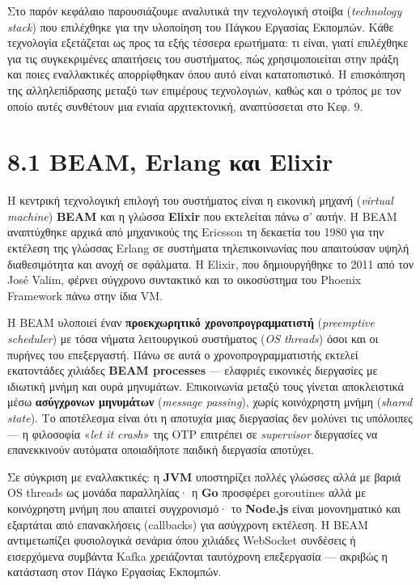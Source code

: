 \documentclass[11pt,a4paper,greek,twoside]{template-xe}
\begin{document}
Στο παρόν κεφάλαιο παρουσιάζουμε αναλυτικά την τεχνολογική στοίβα
(\emph{technology stack}) που επιλέχθηκε για την υλοποίηση του Πάγκου
Εργασίας Εκπομπών. Κάθε τεχνολογία εξετάζεται ως προς τα εξής τέσσερα
ερωτήματα: τι είναι, γιατί επιλέχθηκε για τις συγκεκριμένες απαιτήσεις
του συστήματος, πώς χρησιμοποιείται στην πράξη και ποιες εναλλακτικές
απορρίφθηκαν όπου αυτό είναι κατατοπιστικό. Η επισκόπηση της
αλληλεπίδρασης μεταξύ των επιμέρους τεχνολογιών, καθώς και ο τρόπος με
τον οποίο αυτές συνθέτουν μια ενιαία αρχιτεκτονική, αναπτύσσεται στο
Κεφ. 9.

\section{8.1 BEAM, Erlang και
Elixir}\label{beam-erlang-ux3baux3b1ux3b9-elixir}

Η κεντρική τεχνολογική επιλογή του συστήματος είναι η εικονική μηχανή
(\emph{virtual machine}) \textbf{BEAM} και η γλώσσα \textbf{Elixir} που
εκτελείται πάνω σ' αυτήν. Η BEAM αναπτύχθηκε αρχικά από μηχανικούς της
Ericsson τη δεκαετία του 1980 για την εκτέλεση της γλώσσας Erlang σε
συστήματα τηλεπικοινωνίας που απαιτούσαν υψηλή διαθεσιμότητα και ανοχή
σε σφάλματα. Η Elixir, που δημιουργήθηκε το 2011 από τον José Valim,
φέρνει σύγχρονο συντακτικό και το οικοσύστημα του Phoenix Framework πάνω
στην ίδια VM.

Η BEAM υλοποιεί έναν \textbf{προεκχωρητικό χρονοπρογραμματιστή}
(\emph{preemptive scheduler}) με τόσα νήματα λειτουργικού συστήματος
(\emph{OS threads}) όσοι και οι πυρήνες του επεξεργαστή. Πάνω σε αυτά ο
χρονοπρογραμματιστής εκτελεί εκατοντάδες χιλιάδες \textbf{BEAM
processes} --- ελαφριές εικονικές διεργασίες με ιδιωτική μνήμη και ουρά
μηνυμάτων. Επικοινωνία μεταξύ τους γίνεται αποκλειστικά μέσω
\textbf{ασύγχρονων μηνυμάτων} (\emph{message passing}), χωρίς
κοινόχρηστη μνήμη (\emph{shared state}). Το αποτέλεσμα είναι ότι η
αποτυχία μιας διεργασίας δεν μολύνει τις υπόλοιπες --- η φιλοσοφία
«\emph{let it crash}» της OTP επιτρέπει σε \emph{supervisor} διεργασίες
να επανεκκινούν αυτόματα οποιαδήποτε παιδική διεργασία αποτύχει.

Σε σύγκριση με εναλλακτικές: η \textbf{JVM} υποστηρίζει πολλές γλώσσες
αλλά με βαριά OS threads ως μονάδα παραλληλίας· η \textbf{Go} προσφέρει
goroutines αλλά με κοινόχρηστη μνήμη που απαιτεί συγχρονισμό· το
\textbf{Node.js} είναι μονονηματικό και εξαρτάται από επανακλήσεις
(callbacks) για ασύγχρονη εκτέλεση. Η BEAM αντιμετωπίζει φυσιολογικά
σενάρια όπου χιλιάδες WebSocket συνδέσεις ή εισερχόμενα συμβάντα Kafka
χρειάζονται ταυτόχρονη επεξεργασία --- ακριβώς η κατάσταση στον Πάγκο
Εργασίας Εκπομπών.
\end{document}
